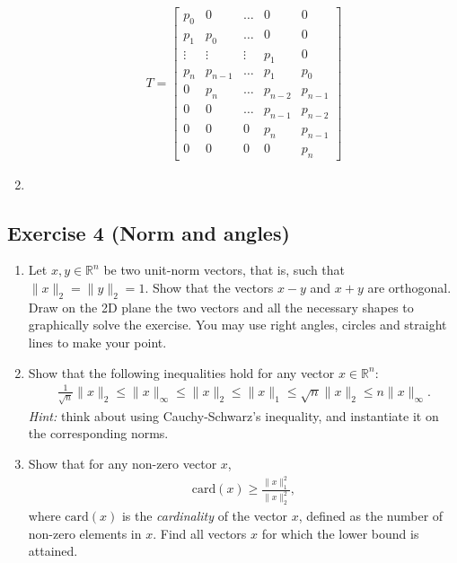 \documentclass[11pt]{article}
\begin{document}
\begin{solution}
\begin{enumerate}
    \begin{align*}
    T =
    \begin{bmatrix}
        p_0 & 0 & \dots & 0 & 0 \\
        p_1 & p_0 & \dots & 0 & 0 \\
        \vdots & \vdots & \vdots & p_1 & 0 \\
        p_{n} & p_{n-1} & \dots & p_1 & p_0 \\
        0 & p_n & \dots & p_{n-2} & p_{n-1} \\
        0 & 0 & \dots & p_{n-1} & p_{n-2} \\
        0 & 0 & 0 & p_{n} & p_{n-1} \\
        0 & 0 & 0 & 0 & p_n
    \end{bmatrix}
    \end{align*}
\item 
\end{enumerate}
\end{solution}

\newpage
\subsection*{Exercise 4 (Norm and angles)}

\begin{enumerate}
    \item Let $x,y\in\mathbb{R}^{n}$ be two unit-norm vectors, that is, such that $\|x\|_2 = \|y\|_2=1$. Show that the vectors $x-y$ and $x+y$ are orthogonal. Draw on the 2D plane the two vectors and all the necessary shapes to graphically solve the exercise. You may use right angles, circles and straight lines to make your point.

    \item
    Show that the following inequalities hold for any vector $x \in \mathbb{R}^{n}$:
    \begin{align*}
        \frac{1}{\sqrt{n}}\|x\|_2 \leq \|x\|_\infty \leq  \|x\|_2 \leq \|x\|_1 \leq \sqrt{n} \|x\|_2 \le n\|x\|_\infty.
    \end{align*}
    \textit{Hint:} think about using Cauchy-Schwarz's inequality, and instantiate it on the corresponding norms.

    \item Show that for any non-zero vector $x$,
    \begin{align*}
        \text{card}(x) \ge \frac{\|x\|_1^2}{\|x\|_2^2},
    \end{align*}
    where $\text{card}(x)$ is the \emph{cardinality} of the vector $x$, defined as the number of non-zero elements in $x$. Find all vectors $x$ for which the lower bound is attained.
\end{enumerate}
\end{document}
